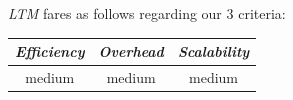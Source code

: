 %
\emph{LTM} fares as follows regarding our $3$  criteria:
\begin{center}
{\footnotesize
\begin{tabular}{ccc}
\emph{Efficiency} & \emph{Overhead} & \emph{Scalability} \\
\hline
medium &
%
medium &
%
medium
\end{tabular}
}
\end{center}


